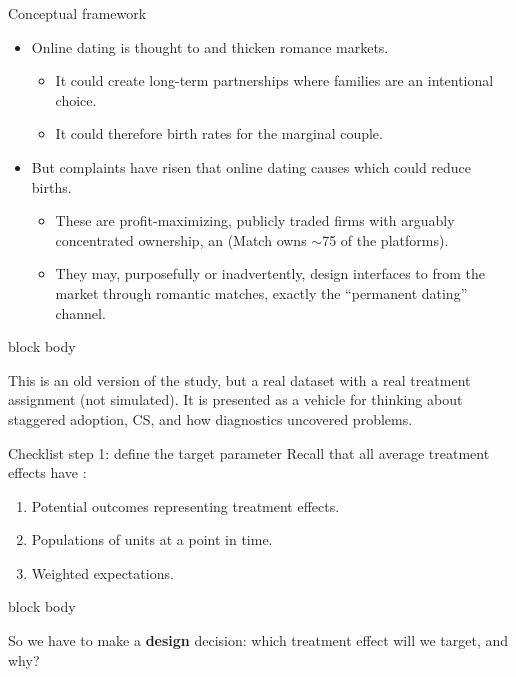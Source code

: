\documentclass[aspectratio=169,11pt]{beamer}
\newcommand{\emphbox}[1]{%
  \begin{beamercolorbox}[rounded=true,sep=7pt,wd=\linewidth]{block body}%
    \small\color{slate}\raggedright #1%
  \end{beamercolorbox}}
\begin{document}
\begin{frame}[shrink=5]{Conceptual framework}
\vspace{0.3em}
\begin{itemize}\small\setlength\itemsep{0.45em}
  \item Online dating is thought to  and thicken romance markets.
  \begin{itemize}\small\setlength\itemsep{0.3em}
    \item It could create long-term partnerships where families are an intentional choice.
    \item It could therefore  birth rates for the marginal couple.
  \end{itemize}
  \item But complaints have risen that online dating causes  which could reduce births.
  \begin{itemize}\small\setlength\itemsep{0.3em}
    \item These are profit-maximizing, publicly traded firms with arguably concentrated ownership, an  (Match owns $\sim$75 of the platforms).
    \item They may, purposefully or inadvertently, design interfaces to  from the market through romantic matches, exactly the ``permanent dating'' channel.
  \end{itemize}
\end{itemize}
\vspace{0.3em}
\emphbox{This is an old version of the study, but a real dataset with a real treatment assignment (not simulated). It is presented as a vehicle for thinking about staggered adoption, CS, and how diagnostics uncovered problems.}
\end{frame}


\begin{frame}{Checklist step 1: define the target parameter}
\vspace{0.5em}
Recall that all average treatment effects have :
\vspace{0.4em}
\begin{enumerate}\setlength\itemsep{0.6em}
  \item Potential outcomes representing treatment effects.
  \item Populations of units at a point in time.
  \item Weighted expectations.
\end{enumerate}
\vspace{0.6em}
\emphbox{So we have to make a \textbf{design} decision: which treatment effect will we target, and why?}
\end{frame}
\end{document}
